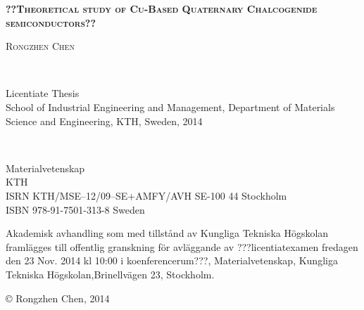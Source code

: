 \documentclass[a4paper, 12pt, titlepage,oneside,drop]{kthesis}
\begin{document}
\setcounter{page}{1}

\begin{center}




  \vspace{5 cm}





  \vspace{12pt}
  \textsc{\LARGE{\textbf{{??Theoretical study of Cu-Based Quaternary Chalcogenide semiconductors??}}}}
  \vspace{12pt}

  \vspace{5 cm}

  \textsc{\large{Rongzhen Chen}}


  \vfill 

  \ 

  \large{Licentiate Thesis}
  \\
  \large{School of Industrial Engineering and Management,
  Department of Materials Science and Engineering,
  KTH, Sweden, 2014}

\end{center}

 \thispagestyle{empty}



\newpage
\setcounter{page}{2}
\thispagestyle{empty}
\
\vfill

\begin{flushright}
 Materialvetenskap\\
 KTH\\
ISRN KTH/MSE--12/09--SE+AMFY/AVH
 \hfill SE-100 44 Stockholm\\ ISBN 978-91-7501-313-8  \hfill
Sweden\\
\end{flushright}


\vspace{5mm}

Akademisk avhandling som med tillstånd av Kungliga Tekniska
Högskolan framlägges till offentlig granskning för avläggande av
{\color{red}???licentiatexamen fredagen den 23 Nov. 2014 kl 10:00 i koenferencerum???}, Materialvetenskap, Kungliga Tekniska
Högskolan,\linebreak Brinellvägen 23, Stockholm.

\vspace{5mm}

\copyright \hspace{3pt} {\color{red}Rongzhen Chen, 2014}
\end{document}
